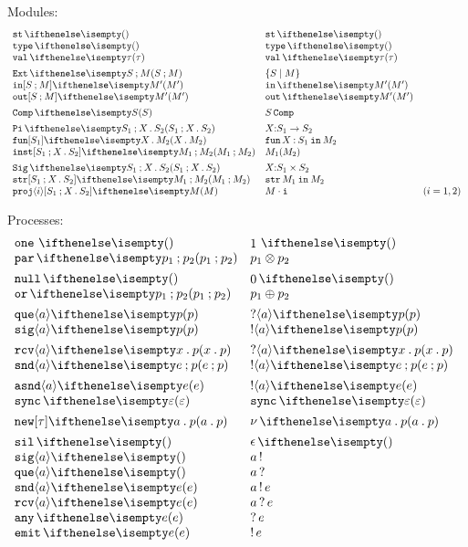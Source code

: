 \documentclass[11pt,twoside]{article}
\begin{document}
\noindent Modules:
\begin{displaymath}
  \begin{array}{l@{\quad}l@{\quad}l}
    \staticLock & \staticLock* \\
    \univSg  & \univSg* \\
    \valSg{\tau} & \valSg*{\tau} \\[1ex]
    \extSg{S}{M} & \extSg*{S}{M} \\
    \inMd[S][M]{M'} & \inMd*{M'} \\
    \outMd[S][M]{M'} & \outMd*{M'} \\[1ex]
    \compSg{S}  & \compSg*{S} \\[1ex]
    \piSg{S_1}{X}{S_2} & \piSg*{S_1}{X}{S_2} \\
    \funMd{S_1}{X}{M_2} & \funMd*{S_1}{X}{M_2} \\
    \instMd[S_1][X][S_2]{M_1}{M_2} & \instMd*{M_1}{M_2} \\[1ex]
    \sigSg{S_1}{X}{S_2} & \sigSg*{S_1}{X}{S_2} \\
    \strMd[S_1][X][S_2]{M_1}{M_2} & \strMd*{M_1}{M_2} \\
    \projMd<i>[S_1][X][S_2]{M} & \projMd*<i>{M} & (i=1,2)
  \end{array}
\end{displaymath}

\noindent Processes:
\begin{displaymath}
  \begin{array}{l@{\quad}l@{\quad}l}
    \unitPr{}    & \unitPr*{} \\
    \parPr{p_1}{p_2} & \parPr*{p_1}{p_2} \\[1ex]
    \nullPr{} & \nullPr*{} \\
    \choosePr{p_1}{p_2}  & \choosePr*{p_1}{p_2} \\[1ex]
    \quePr{a}{p} & \quePr*{a}{p} \\
    \sigPr{a}{p}  & \sigPr*{a}{p} \\[1ex]
    \rcvPr{a}{x}{p} & \rcvPr*{a}{x}{p} \\
    \sndPr{a}{e}{p} & \sndPr*{a}{e}{p} \\[1ex]
    \asndPr{a}{e} & \asndPr*{a}{e} \\
    \syncPr{\varepsilon} & \syncPr*{\varepsilon} \\[1ex]
    \newPr{a}{p} & \newPr*{a}{p} \\[1ex]
    \silAc & \silAc* \\
    \sigAc{a} & \sigAc*{a} \\
    \queAc{a}  & \queAc*{a} \\
    \sndAc{a}{e} & \sndAc*{a}{e} \\
    \rcvAc{a}{e} & \rcvAc*{a}{e} \\
    \anyAc{e}  & \anyAc*{e} \\
    \emitAc{e} & \emitAc*{e}
  \end{array}
\end{displaymath}
\end{document}
